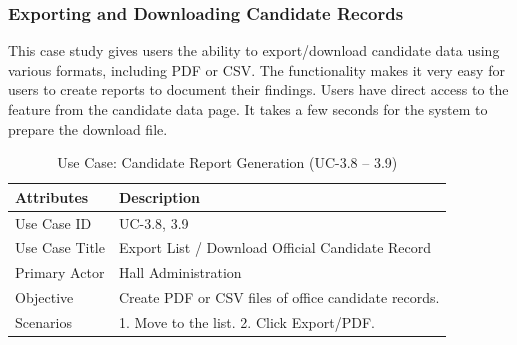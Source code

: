 \subsubsection{Exporting and Downloading Candidate Records}
This case study gives users the ability to export/download candidate data using various formats, including PDF or CSV. The functionality makes it very easy for users to create reports to document their findings. Users have direct access to the feature from the candidate data page. It takes a few seconds for the system to prepare the download file.
\begin{table}[H]
    \centering
    \small
    \renewcommand{\arraystretch}{1.4}
    \caption{Use Case: Candidate Report Generation (UC-3.8 – 3.9)}
    \label{tab:candidate_report_generation}
    
    \begin{tabularx}{\textwidth}{|l|X|}
        \hline
        \rowcolor[gray]{0.9} {Attributes} & {Description} \\ \hline
        Use Case ID & UC-3.8, 3.9 \\ \hline
        Use Case Title & Export List / Download Official Candidate Record \\ \hline
        Primary Actor & Hall Administration \\ \hline
        Objective & Create PDF or CSV files of office candidate records. \\ \hline
        Scenarios & 1. Move to the list. 2. Click Export/PDF. \\ \hline
    \end{tabularx}
\end{table}
\FloatBarrier